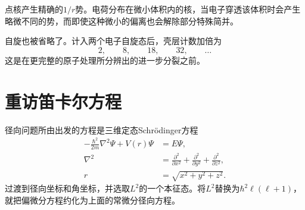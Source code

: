 点核产生精确的\(1/r\)势。电荷分布在微小体积内的核，当电子穿透该体积时会产生略微不同的势，而即使这种微小的偏离也会解除部分特殊简并。

自旋也被省略了。计入两个电子自旋态后，壳层计数加倍为
\begin{equation}
2,\qquad 8,\qquad 18,\qquad 32,\qquad \ldots
\end{equation}
这是在更完整的原子处理所分辨出的进一步分裂之前。

\section{重访笛卡尔方程}

径向问题所由出发的方程是三维定态Schr\"odinger方程
\begin{equation}
\begin{aligned}
-\frac{\hbar^2}{2m}\nabla^2\Psi+V(r)\Psi&=E\Psi,\\
\nabla^2&=\frac{\partial^2}{\partial x^2}
+\frac{\partial^2}{\partial y^2}
+\frac{\partial^2}{\partial z^2},\\
r&=\sqrt{x^2+y^2+z^2}.
\end{aligned}
\end{equation}
过渡到径向坐标和角坐标，并选取\(L^2\)的一个本征态。将\(L^2\)替换为\(\hbar^2\ell(\ell+1)\)，就把偏微分方程约化为上面的常微分径向方程。

\begin{classroomqa}
\end{classroomqa}

\begin{classroomqa}
\end{classroomqa}

\begin{classroomqa}
\end{classroomqa}

